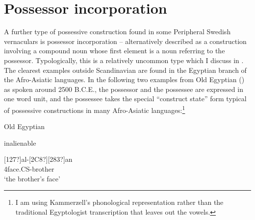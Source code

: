 {%

\section{Possessor incorporation}

A further type of possessive construction found in some Peripheral Swedish vernaculars is possessor incorporation – alternatively described as a construction involving a compound noun whose first element is a noun referring to the possessor. Typologically, this is a relatively uncommon type which I discuss in \citet{Dahl2004}. The clearest examples outside Scandinavian are found in the Egyptian branch of the Afro-Asiatic languages. In the following two examples from Old Egyptian (\citet{Kammerzell2000}) as spoken around 2500 B.C.E., the possessor and the possessee are expressed in one word unit, and the possessee takes the special “construct state” form typical of possessive constructions in many Afro-Asiatic languages:\footnote{ I am using Kammerzell’s phonological representation rather than the traditional Egyptologist transcription that leaves out the vowels.}


\item 

Old Egyptian



\item 

inalienable



\ea\label{}
[127?]al-[2C8?][283?]an\\
4face.CS-brother\\
\glt ‘the brother’s face’  
\z

}
